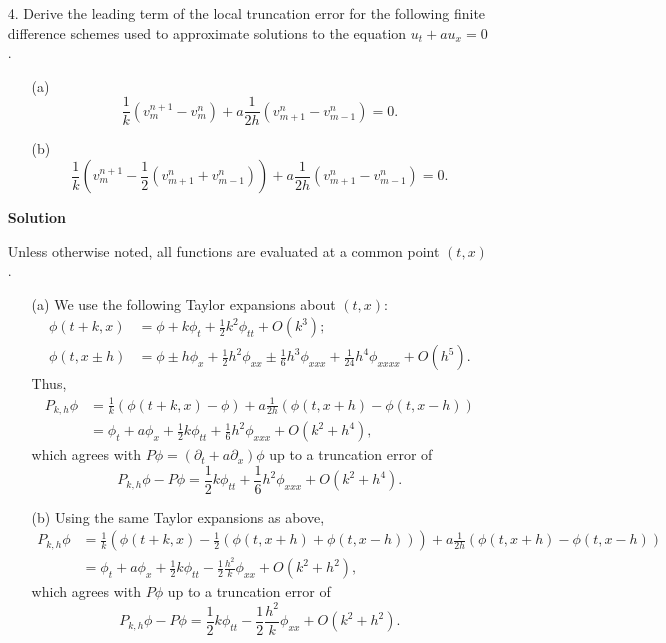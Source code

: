 \documentclass{article}
\begin{document}
\begin{itemize}
\item[4.] Derive the leading term of the local truncation error for the following finite difference schemes used to approximate solutions to the equation $u_t + a u_x = 0$.
\begin{itemize}
\item[(a)]
\begin{equation*}
\frac{1}{k} \left( v^{n+1}_m - v^n_m \right) + a \frac{1}{2h} \left( v^n_{m+1} - v^n_{m-1} \right) = 0.
\end{equation*}
\item [(b)]
\begin{equation*}
\frac{1}{k} \left( v^{n+1}_m - \frac{1}{2} \left( v^n_{m+1} + v^n_{m-1} \right) \right) + a \frac{1}{2h} \left( v^n_{m+1} - v^n_{m-1} \right) = 0.
\end{equation*}
\end{itemize}

\textbf{Solution}

Unless otherwise noted, all functions are evaluated at a common point $(t,x)$.

\begin{itemize}
\item[(a)] We use the following Taylor expansions about $(t,x)$:
\begin{align*}
\phi(t+k,x) & = \phi + k \phi_t + \frac{1}{2} k^2 \phi_{tt} + O \left( k^3 \right); \\
\phi(t,x \pm h) & = \phi \pm h \phi_x + \frac{1}{2} h^2 \phi_{xx} \pm \frac{1}{6} h^3 \phi_{xxx} + \frac{1}{24} h^4 \phi_{xxxx} + O \left( h^5 \right).
\end{align*}
Thus,
\begin{align*}
P_{k,h} \phi & = \frac{1}{k} \left( \phi(t+k,x) - \phi \right) + a \frac{1}{2h} \left( \phi(t,x+h) - \phi(t,x-h) \right) \\
             & = \phi_t + a \phi_x + \frac{1}{2} k \phi_{tt} + \frac{1}{6} h^2 \phi_{xxx} + O \left( k^2 + h^4 \right),
\end{align*}
which agrees with $P \phi = \left( \partial_t + a \partial_x \right) \phi$ up to a truncation error of
\begin{equation*}
P_{k,h} \phi - P \phi = \frac{1}{2} k \phi_{tt} + \frac{1}{6} h^2 \phi_{xxx} + O \left( k^2 + h^4 \right).
\end{equation*}
\item[(b)] Using the same Taylor expansions as above,
\begin{align*}
P_{k,h} \phi & = \frac{1}{k} \left( \phi(t+k,x) - \frac{1}{2} \left( \phi(t,x+h) + \phi(t,x-h) \right) \right) + a \frac{1}{2h} \left( \phi(t,x+h) - \phi(t,x-h) \right) \\
             & = \phi_t + a \phi_x + \frac{1}{2} k \phi_{tt} - \frac{1}{2} \frac{h^2}{k} \phi_{xx} + O \left( k^2 + h^2 \right),
\end{align*}
which agrees with $P \phi$ up to a truncation error of
\begin{equation*}
P_{k,h} \phi - P \phi = \frac{1}{2} k \phi_{tt} - \frac{1}{2} \frac{h^2}{k} \phi_{xx} + O \left( k^2 + h^2 \right).
\end{equation*}
\end{itemize}


\end{itemize}
\end{document}
